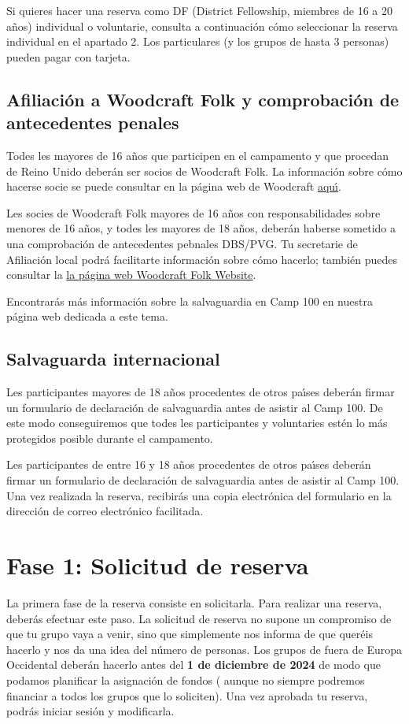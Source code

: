 \documentclass[a4paper, 11pt]{report}
\begin{document}
Si quieres hacer una reserva como DF (District Fellowship, miembres de 16 a 20 a\~nos) individual o voluntarie, consulta a continuaci\'on c\'omo seleccionar la reserva individual en el apartado 2. Los particulares (y los grupos de hasta 3 personas) pueden pagar con tarjeta. 
 

\section{Afiliaci\'on a Woodcraft Folk y comprobaci\'on de antecedentes penales}
Todes les mayores de 16 a\~nos que participen en el campamento y que procedan de Reino Unido deber\'an ser socios de Woodcraft Folk. La informaci\'on sobre c\'omo hacerse socie se puede consultar en la p\'agina web de Woodcraft \href{https://woodcraft.org.uk/get-involved/volunteering-with-woodcraft-folk/}{aqu\'{\i}}.

Les socies de Woodcraft Folk mayores de 16 a\~nos con responsabilidades sobre menores de 16 a\~nos, y todes les mayores de 18 a\~nos, deber\'an haberse sometido a una comprobaci\'on de antecedentes pebnales DBS/PVG.
Tu secretarie de Afiliaci\'on local podr\'a facilitarte informaci\'on sobre c\'omo hacerlo;
tambi\'en puedes consultar la \href{https://woodcraft.org.uk/get-involved/volunteering-with-woodcraft-folk/}{la p\'agina web Woodcraft Folk Website}.

Encontrar\'as m\'as informaci\'on sobre la salvaguardia en Camp 100 en nuestra p\'agina web dedicada a este tema. 

\section{Salvaguarda internacional }
Les participantes mayores de 18 a\~nos procedentes de otros pa\'{\i}ses deber\'an firmar un formulario de declaraci\'on de salvaguardia antes de asistir al Camp 100. De este modo conseguiremos que todes les participantes y voluntaries est\'en lo m\'as protegidos posible durante el campamento.

Les participantes de entre 16 y 18 a\~nos procedentes de otros pa\'{\i}ses deber\'an firmar un formulario de declaraci\'on de salvaguardia antes de asistir al Camp 100. 
Una vez realizada la reserva, recibir\'as una copia electr\'onica del formulario en la direcci\'on de correo electr\'onico facilitada. 
 


\chapter{Fase 1: Solicitud de reserva}
\label{chap:apply}
La primera fase de la reserva consiste en solicitarla. Para realizar una reserva, deber\'as efectuar este paso. La solicitud de reserva no supone un compromiso de que tu grupo vaya a venir, sino que simplemente nos informa de que quer\'eis hacerlo y nos da una idea del n\'umero de personas. Los grupos de fuera de Europa Occidental deber\'an hacerlo antes del \textbf{1 de diciembre de 2024} de modo que podamos planificar la asignaci\'on de fondos ( aunque no siempre podremos financiar a todos los grupos que lo soliciten). Una vez aprobada tu reserva, podr\'as iniciar sesi\'on y modificarla.
\end{document}
